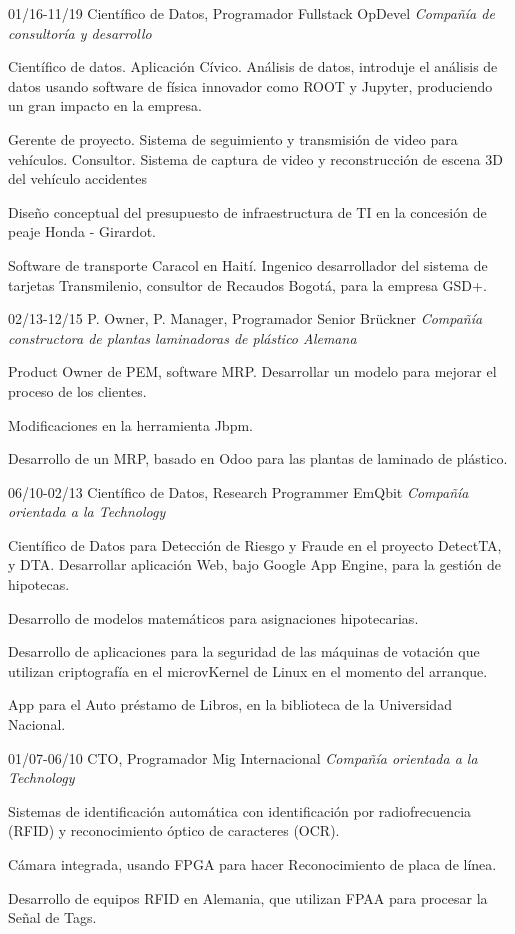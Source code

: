 \begin{entrylist}
  \entry
    {01/16-11/19}
    {Científico de Datos, Programador Fullstack}
    {OpDevel {\sl Compañía de consultoría y desarrollo}}
{Científico de datos. Aplicación Cívico. Análisis de datos, introduje el análisis de datos usando
software de física innovador como ROOT y Jupyter, produciendo un gran impacto en
la empresa.

Gerente de proyecto. Sistema de seguimiento y transmisión de video para vehículos.
Consultor. Sistema de captura de video y reconstrucción de escena 3D del vehículo
accidentes

Diseño conceptual del presupuesto de infraestructura de TI en la concesión de peaje Honda - Girardot.

Software de transporte Caracol en Haití. Ingenico desarrollador del sistema de tarjetas Transmilenio,
consultor de Recaudos Bogotá, para la empresa GSD+.}
  \entry
	{02/13-12/15}
	{P. Owner, P. Manager, Programador Senior}
	{Brückner {\sl Compañía constructora de plantas laminadoras de plástico Alemana}}
	{Product Owner de PEM, software MRP. Desarrollar un modelo para mejorar el proceso de los clientes.

Modificaciones en la herramienta Jbpm.

	Desarrollo de un MRP, basado en Odoo para las plantas de laminado de plástico.}

  \entry
	{06/10-02/13}
	{Científico de Datos, Research Programmer}
	{EmQbit {\sl Compañía orientada a la Technology}}
	{Científico de Datos para Detección de Riesgo y Fraude en el proyecto DetectTA, y DTA.
Desarrollar aplicación Web, bajo Google App Engine, para la gestión de hipotecas.

Desarrollo de modelos matemáticos para asignaciones hipotecarias.

Desarrollo de aplicaciones para la seguridad de las máquinas de votación que utilizan criptografía
en el microvKernel de Linux en el momento del arranque.

App para el Auto préstamo de Libros, en la biblioteca de la Universidad Nacional.}

  \entry
	{01/07-06/10}
	{CTO, Programador}
	{Mig Internacional {\sl Compañía orientada a la Technology}}
	{Sistemas de identificación automática con identificación por radiofrecuencia (RFID)
y reconocimiento óptico de caracteres (OCR).

Cámara integrada, usando FPGA para hacer Reconocimiento de placa de línea.

Desarrollo de equipos RFID en Alemania, que utilizan FPAA para procesar la
Señal de Tags.}


\end{entrylist}
